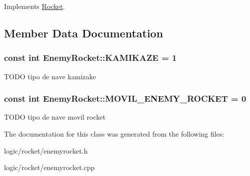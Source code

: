 Implements \hyperlink{class_rocket_a5164f5926f96291b57da2516d46262e8}{Rocket}.



\subsection{Member Data Documentation}
\hypertarget{class_enemy_rocket_a15caca840f5e774985fecf4295d9446d}{
\subsubsection[{K\-A\-M\-I\-K\-A\-Z\-E}]{\setlength{\rightskip}{0pt plus 5cm}const int Enemy\-Rocket\-::\-K\-A\-M\-I\-K\-A\-Z\-E = 1\hspace{0.3cm}{\ttfamily [static]}}}\label{class_enemy_rocket_a15caca840f5e774985fecf4295d9446d}
T\-O\-D\-O tipo de nave kamizake \hypertarget{class_enemy_rocket_a62103a6d3bc8dd2860b91d5250113281}{
\subsubsection[{M\-O\-V\-I\-L\-\_\-\-E\-N\-E\-M\-Y\-\_\-\-R\-O\-C\-K\-E\-T}]{\setlength{\rightskip}{0pt plus 5cm}const int Enemy\-Rocket\-::\-M\-O\-V\-I\-L\-\_\-\-E\-N\-E\-M\-Y\-\_\-\-R\-O\-C\-K\-E\-T = 0\hspace{0.3cm}{\ttfamily [static]}}}\label{class_enemy_rocket_a62103a6d3bc8dd2860b91d5250113281}
T\-O\-D\-O tipo de nave movil rocket 

The documentation for this class was generated from the following files\-:\begin{DoxyCompactItemize}
\item 
logic/rocket/enemyrocket.\-h\item 
logic/rocket/enemyrocket.\-cpp\end{DoxyCompactItemize}
